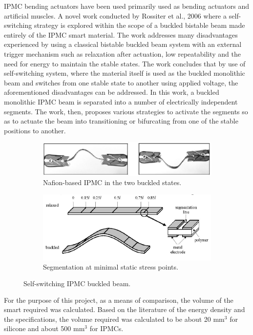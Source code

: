 IPMC bending actuators have been used primarily used as bending actuators and artificial muscles. A novel work conducted by Rossiter et al., 2006\cite{rossiter_self-switching_2006, rossiter_bistable_2006} where a self-switching strategy is explored within the scope of a buckled bistable beam made entirely of the IPMC smart material. The work addresses many disadvantages experienced by using a classical bistable buckled beam system with an external trigger mechanism such as relaxation after actuation, low repeatability and the need for energy to maintain the stable states. The work concludes that by use of self-switching system, where the material itself is used as the buckled monolithic beam and switches from one stable state to another using applied voltage, the aforementioned disadvantages can be addressed. In this work, a buckled monolithic IPMC beam is separated into a number of electrically independent segments. The work, then, proposes various strategies to activate the segments so as to actuate the beam into transitioning or bifurcating from one of the stable positions to another.
\begin{figure}[H]
    \centering
    \begin{subfigure}[t]{0.5\textwidth}
			\includegraphics[width=\textwidth]{Figures/IPMC_buckle.png}
			\caption{Nafion-based IPMC in the two buckled states.}
			\label{fig:IPMC_buckle}
    \end{subfigure}

    \begin{subfigure}[t]{0.6\textwidth}
			\includegraphics[width=\textwidth]{Figures/IPMC_segment.png}
			\caption{Segmentation at minimal static stress points.}
			\label{fig:IPMC_segment}
    \end{subfigure}
		\caption{Self-switching IPMC buckled beam\cite{rossiter_self-switching_2006}.}
		\label{fig:IPMC_work}
\end{figure}
For the purpose of this project, as a means of comparison, the volume of the smart required was calculated. Based on the literature of the energy density and the specifications, the volume required was calculated to be about 20 mm$^3$ for silicone and about 500 mm$^3$ for IPMCs.

